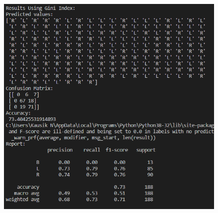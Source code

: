 \documentclass[12pt]{article}
\renewcommand{\_}{\kern-1.5pt\textunderscore\kern-1.5pt}
\begin{document}
\begin{figure}[H]
	\begin{Center}
		\includegraphics[width=6.5in,height=5.13in]{./media/image12.png}
	\end{Center}
\end{figure}



\par



\end{document}
